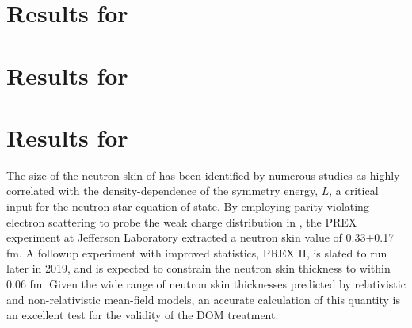 \section{Results for \niEightFour}

\section{Results for \snTwelveFour}

\section{Results for \pbEight}
The size of the neutron skin of \pbEight has been identified by numerous studies as highly
correlated with the density-dependence of the symmetry energy, $L$, a critical input for the neutron
star equation-of-state. By employing parity-violating electron scattering to probe the
weak charge distribution in \pbEight, the PREX experiment at Jefferson Laboratory extracted a
\pbEight neutron skin value of 0.33$\pm$0.17 fm. A followup experiment with improved statistics, PREX II,
is slated to run later in 2019, and is expected to constrain the \pbEight neutron skin thickness to
within 0.06 fm. Given the wide range of \pbEight neutron skin thicknesses predicted by relativistic
and non-relativistic mean-field models, an accurate calculation of this quantity is an excellent
test for the validity of the DOM treatment.


\afterpage{\clearpage}
